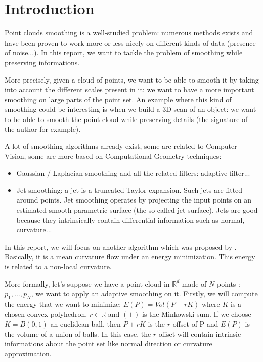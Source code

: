 \chapter{Introduction}


Point clouds smoothing is a well-studied problem: numerous methods exists and
have been proven to work more or less nicely on different kinds of data
(presence of noise...). In this report, we want to tackle the problem of
smoothing while preserving informations.

More precisely, given a cloud of points, we want to be able to smooth it by
taking into account the different scales present in it: we want to have a more
important smoothing on large parts of the point set. An example where this kind
of smoothing could be interesting is when we build a 3D scan of an object: we
want to be able to smooth the point cloud while preserving details (the
signature of the author for example).

A lot of smoothing algorithms already exist, some are related to Computer
Vision, some are more based on Computational Geometry techniques:
\begin{itemize}
    \item Gaussian / Laplacian smoothing and all the related filters: adaptive
        filter...
    \item Jet smoothing: a jet is a truncated Taylor expansion. Such jets are
        fitted around points. Jet smoothing operates by projecting the input
        points on an estimated smooth parametric surface (the so-called jet
        surface). Jets are good because they intrinsically contain
        differential information such as normal, curvature...
\end{itemize}

In this report, we will focus on another algorithm which was proposed by
\cite{chambolle2012nonlocal}. Basically, it is a mean curvature flow under an
energy minimization. This energy is related to a non-local curvature.

More formally, let's suppose we have a point cloud in $ \mathbb{R}^d $ made of $
N $ points : $ p_1, \ldots, p_N $, we want to apply an adaptive smoothing on it.
Firstly, we will compute the energy that we want to minimize: $ E(P) = Vol(P + r
K) $ where $ K $ is a chosen convex polyhedron, $ r \in \mathbb{R} $ and $ (+) $ is
the Minkowski sum. If we choose $ K = B(0, 1) $ an euclidean ball, then $ P + rK
$ is the $ r $-offset of P and $ E(P) $ is the volume of a union of balls. In
this case, the $ r $-offset will contain intrinsic informations about the point
set like normal direction or curvature approximation.

